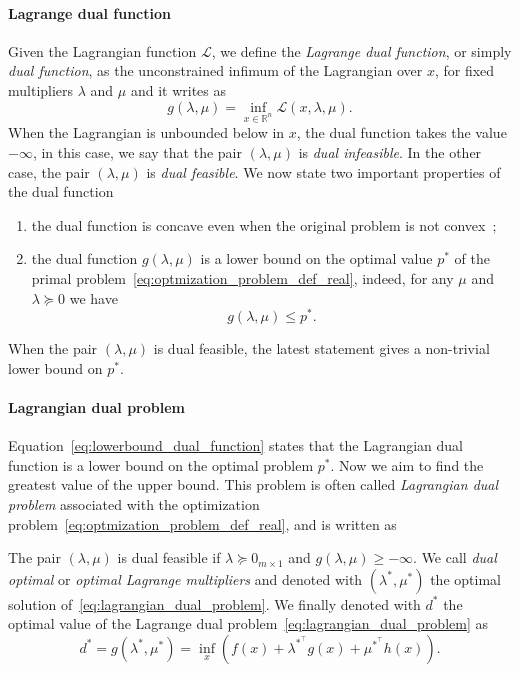 \paragraph{Lagrange dual function}
Given the Lagrangian function $\mathcal{L}$, we define the \emph{Lagrange dual function}, or simply \emph{dual function}, as the unconstrained infimum of the Lagrangian over $x$, for fixed multipliers $\lambda$ and $\mu$ and it writes as
\begin{equation}
    \label{eq:dual_function}
    g(\lambda, \mu) = \inf\limits_{x\in \mathbb{R}^n} \mathcal{L}(x, \lambda, \mu).
\end{equation}
When the Lagrangian is unbounded below in $x$, the dual function takes the
value $-\infty$, in this case, we say that the pair $(\lambda, \mu)$ is \emph{dual infeasible}. In the other case, the pair $(\lambda, \mu)$ is \emph{dual feasible}.
We now state two important properties of the dual function
\begin{enumerate}
    \item the dual function is concave even when the original problem is not convex~\citep[Chapter 5.1.2]{Boyd2004ConvexOptimization};
    \item the dual function $g(\lambda, \mu)$ is a lower bound on the optimal value $p^*$ of the primal problem~\eqref{eq:optmization_problem_def_real}, indeed, for any $\mu$ and $\lambda \succeq 0$ we have
    \begin{equation}
        \label{eq:lowerbound_dual_function}
        g(\lambda, \mu) \le p^*.
    \end{equation}
\end{enumerate}
When the pair $(\lambda, \mu)$ is dual feasible, the latest statement gives a non-trivial lower bound on $p^*$.

\paragraph{Lagrangian dual problem}
Equation~\eqref{eq:lowerbound_dual_function} states that the Lagrangian dual function is a lower bound on the optimal problem $p^*$. Now we aim to find the greatest value of the upper bound. This problem is often called \emph{Lagrangian dual problem} associated with the optimization problem~\eqref{eq:optmization_problem_def_real}, and is written as
The pair $(\lambda, \mu)$ is dual feasible if $\lambda \succeq 0_{m\times1}$ and $g(\lambda, \mu) \ge -\infty$. We call \emph{dual optimal} or \emph{optimal Lagrange multipliers} and denoted with $(\lambda^*, \mu^*)$ the optimal solution of~\eqref{eq:lagrangian_dual_problem}. We finally denoted with $d^*$ the optimal value of the Lagrange dual problem~\eqref{eq:lagrangian_dual_problem} as
\begin{equation}
\label{eq:optimal_lagrange_multipliers}
    d^* = g(\lambda^*, \mu^*) =  \inf_x \left(f(x) + \lambda^{* ^\top} g(x) + \mu ^{* ^\top} h(x)\right).
\end{equation}
